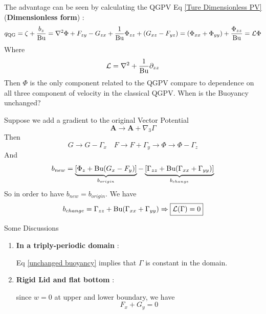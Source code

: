 \documentclass[../SQG_notes.tex]{subfiles}
\begin{document}
    The advantage can be seen by calculating the QGPV Eq \ref{Ture Dimensionless PV} (\textbf{Dimensionless form}) : 
    \begin{equation}
        q_{\text{QG}} = \zeta + \frac{b_z}{\text{Bu}} = \nabla^2 \Phi + F_{zy} - G_{zx} + \frac{1}{\text{Bu}}\Phi_{zz} +(G_{xz} - F_{yz}) = (\Phi_{xx} + \Phi_{yy}) + \frac{\Phi_{zz}}{\text{Bu}} = \mathcal{L} \Phi
    \end{equation}
    Where 
    \begin{equation}
        \mathcal{L} = \nabla^2 + \frac{1}{\text{Bu}}\partial_{zz} \label{modified laplacian}
    \end{equation} 
    Then $\Phi$ is the only component related to the QGPV compare to dependence on all three component of velocity in the classical QGPV. When is the Buoyancy unchanged? \par
    \begin{explanation}
        Suppose we add a gradient to the original Vector Potential 
        \[ \bm{A} \rightarrow \bm{A} + \nabla_3 \Gamma\]
        Then 
        \[ G \rightarrow G - \Gamma_x  \quad F \rightarrow F + \Gamma_y \rightarrow \Phi \rightarrow \Phi - \Gamma_z\]
        And 
        \[ b_{new} = \underbrace{\left[ \Phi_z + \text{Bu}(G_x - F_y) \right]}_{b_{origin}} - \underbrace{\left[ \Gamma_{zz} + \text{Bu}(\Gamma_{xx} + \Gamma_{yy}) \right]}_{b_{change}}\]
        So in order to have $b_{new} = b_{origin}$. We have 
        \begin{equation}
            b_{change} =  \Gamma_{zz} + \text{Bu}(\Gamma_{xx} + \Gamma_{yy}) \Rightarrow \boxed{\mathcal{L}(\Gamma) = 0} \label{unchanged buoyancy}
        \end{equation}
    \end{explanation}
    Some Discussions
    \begin{enumerate}
        \item\textbf{In a triply-periodic domain} : \par Eq \ref{unchanged buoyancy} implies that $\Gamma$ is constant in the domain.
        \item \textbf{Rigid Lid and flat bottom} : \par since $w = 0$ at upper and lower boundary, we have 
        \[ F_x + G_y = 0\]
    \end{enumerate}
\end{document}
